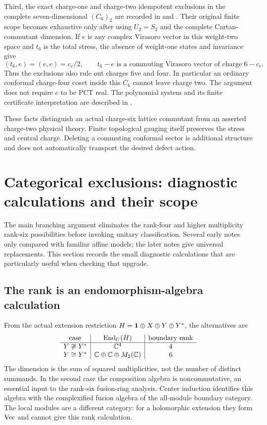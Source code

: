 Third, the exact charge-one and charge-two idempotent exclusions
in the complete seven-dimensional $(C_6)_2$ are recorded in
and
.
Their original finite scope becomes exhaustive only after using
$U_2=S_2$ and the complete Cartan-commutant dimension. If $e$ is
any complex Virasoro vector in this weight-two space and $t_6$
is the total stress, the absence of weight-one states and
invariance give
\[
 (t_6,e)=(e,e)=c_e/2,
 \qquad t_6-e\text{ is a commuting Virasoro vector of charge }6-c_e.
\]
Thus the exclusions also rule out charges five and four. In
particular an ordinary conformal charge-four coset inside this
$C_6$ cannot leave charge two. The argument does not require
$e$ to be PCT real. The polynomial system and its finite
certificate interpretation are described in
.

These facts distinguish an actual charge-six lattice commutant
from an asserted charge-two physical theory. Finite topological
gauging itself preserves the stress and central charge. Deleting
a commuting conformal sector is additional structure and does not
automatically transport the desired defect action.

\section{Categorical exclusions: diagnostic calculations and their scope}
\label{expstructure:categorical-diagnostics}

The main branching argument eliminates the rank-four and higher
multiplicity rank-six possibilities before invoking unitary
classification. Several early notes only compared with familiar
affine models; the later notes give universal replacements.
This section records the small diagnostic calculations that are
particularly useful when checking that upgrade.

\subsection{The rank is an endomorphism-algebra calculation}

From the actual extension restriction
$H=\one\oplus X\oplus Y\oplus Y^*$, the alternatives are
\[
\begin{array}{c|c|c}
\text{case}&\End_U(H)&\text{boundary rank}\\\hline
Y\not\cong Y^*&\CC^4&4\\
Y\cong Y^*&\CC\oplus\CC\oplus M_2(\CC)&6
\end{array}
\]
The dimension is the sum of squared multiplicities, not the number
of distinct summands. In the second case the composition algebra
is noncommutative, an essential input to the rank-six fusion-ring
analysis. Center induction identifies this algebra with the
complexified fusion algebra of the all-module boundary category.
The local modules are a different category: for a holomorphic
extension they form $\Vec$ and cannot give this rank calculation.

